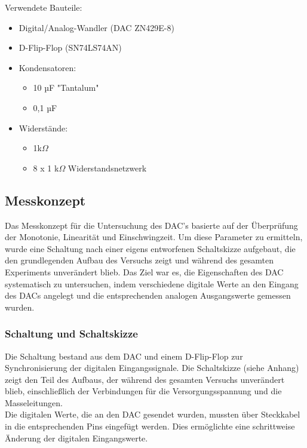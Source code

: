 \documentclass[a4paper,12pt]{article}
\begin{document}
\noindent Verwendete Bauteile:
\begin{itemize}
\item Digital/Analog-Wandler (DAC ZN429E-8)
\item D-Flip-Flop (SN74LS74AN)
\newpage
\item Kondensatoren: 
	\begin{itemize}
	\item 10 µF "Tantalum"
	\item 0,1 µF
	\end{itemize}
\item Widerstände: 
	\begin{itemize}
	\item 1k$\Omega$
	\item 8 x 1 k$\Omega$ Widerstandsnetzwerk
	\end{itemize}
\end{itemize}

\subsection{Messkonzept}
Das Messkonzept für die Untersuchung des DAC's basierte auf der Überprüfung der Monotonie, Linearität und Einschwingzeit. Um diese Parameter zu ermitteln, wurde eine Schaltung nach einer eigens entworfenen Schaltskizze aufgebaut, die den grundlegenden Aufbau des Versuchs zeigt und während des gesamten Experiments unverändert blieb. Das Ziel war es, die Eigenschaften des DAC systematisch zu untersuchen, indem verschiedene digitale Werte an den Eingang des DACs angelegt und die entsprechenden analogen Ausgangswerte gemessen wurden.

\subsubsection {Schaltung und Schaltskizze}

Die Schaltung bestand aus dem DAC und einem D-Flip-Flop zur Synchronisierung der digitalen Eingangssignale. Die Schaltskizze (siehe Anhang) zeigt den Teil des Aufbaus, der während des gesamten Versuchs unverändert blieb, einschließlich der Verbindungen für die Versorgungsspannung und die Masseleitungen.\\
\noindent Die digitalen Werte, die an den DAC gesendet wurden, mussten über Steckkabel in die entsprechenden Pins eingefügt werden. Dies ermöglichte eine schrittweise Änderung der digitalen Eingangswerte.
\end{document}
